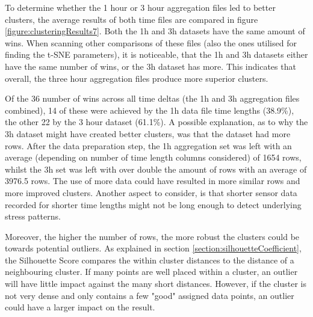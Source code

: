 To determine whether the 1 hour or 3 hour aggregation files led to better clusters, the average results of both time files are compared in figure \ref{figure:clusteringResults7}. Both the 1h and 3h datasets have the same amount of wins. When scanning other comparisons of these files (also the ones utilised for finding the t-SNE parameters), it is noticeable, that the 1h and 3h datasets either have the same number of wins, or the 3h dataset has more. This indicates that overall, the three hour aggregation files produce more superior clusters.

Of the 36 number of wins across all time deltas (the 1h and 3h aggregation files combined), 14 of these were achieved by the 1h data file time lengths (38.9\%), the other 22 by the 3 hour dataset (61.1\%). A possible explanation, as to why the 3h dataset might have created better clusters, was that the dataset had more rows. After the data preparation step, the 1h aggregation set was left with an average (depending on number of time length columns considered) of 1654 rows, whilst the 3h set was left with over double the amount of rows with an average of 3976.5 rows. The use of more data could have resulted in more similar rows and more improved clusters. Another aspect to consider, is that shorter sensor data recorded for shorter time lengths might not be long enough to detect underlying stress patterns.

Moreover, the higher the number of rows, the more robust the clusters could be towards potential outliers. As explained in section \ref{section:silhouetteCoefficient}, the Silhouette Score compares the within cluster distances to the distance of a neighbouring cluster. If many points are well placed within a cluster, an outlier will have little impact against the many short distances. However, if the cluster is not very dense and only contains a few "good" assigned data points, an outlier could have a larger impact on the result.








